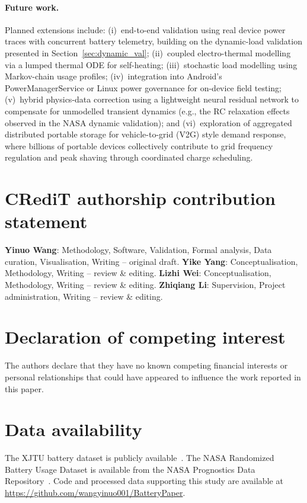 \documentclass[5p,times,number]{elsarticle}
\newcommand{\secref}[1]{\textcolor{supercolor}{Section~\ref{#1}}}
\begin{document}
\paragraph{Future work.}
Planned extensions include:
(i)~end-to-end validation using real device power traces with concurrent battery telemetry, building on the dynamic-load validation presented in \secref{sec:dynamic_val};
(ii)~coupled electro-thermal modelling via a lumped thermal ODE for self-heating;
(iii)~stochastic load modelling using Markov-chain usage profiles;
(iv)~integration into Android's PowerManagerService or Linux power governance for on-device field testing;
(v)~hybrid physics-data correction using a lightweight neural residual network to compensate for unmodelled transient dynamics (e.g., the RC relaxation effects observed in the NASA dynamic validation);
and (vi)~exploration of aggregated distributed portable storage for vehicle-to-grid (V2G) style demand response, where billions of portable devices collectively contribute to grid frequency regulation and peak shaving through coordinated charge scheduling.

\section*{CRediT authorship contribution statement}
\textbf{Yinuo Wang}: Methodology, Software, Validation, Formal analysis, Data curation, Visualisation, Writing -- original draft.
\textbf{Yike Yang}: Conceptualisation, Methodology, Writing -- review \& editing.
\textbf{Lizhi Wei}: Conceptualisation, Methodology, Writing -- review \& editing.
\textbf{Zhiqiang Li}: Supervision, Project administration, Writing -- review \& editing.

\section*{Declaration of competing interest}
The authors declare that they have no known competing financial interests or personal relationships that could have appeared to influence the work reported in this paper.

\section*{Data availability}
The XJTU battery dataset is publicly available~\cite{XJTU2020}. The NASA Randomized Battery Usage Dataset is available from the NASA Prognostics Data Repository~\cite{Bole2014}. Code and processed data supporting this study are available at \url{https://github.com/wangyinuo001/BatteryPaper}.
\end{document}
